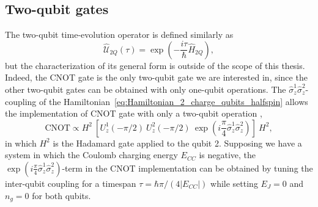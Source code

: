 \documentclass[../main/main.tex]{subfiles}
\begin{document}
\subsection{Two-qubit gates} \label{sect:2Q_gates_implementation}
The two-qubit time-evolution operator is defined similarly as
\begin{equation} \label{eq:time_evolution_H2Q}
    \hat{\mathcal{U}}_{2Q}(\tau) = \exp{\left(-\frac{i \tau}{\hbar} \hat{H}_{2Q}\right)},
\end{equation}
but the characterization of its general form is outside of the scope of this thesis. Indeed, the CNOT gate is the only two-qubit gate we are interested in, since the other two-qubit gates can be obtained with only one-qubit operations. The $\hat{\sigma}_z^1 \hat{\sigma}_z^2$-coupling of the Hamiltonian~\eqref{eq:Hamiltonian_2_charge_qubits_halfspin} allows the implementation of CNOT gate with only a two-qubit operation \cite[Appx.~B3]{RevModPhys.73.357}, 
\begin{equation} \label{eq:CNOT_gate}
   \text{CNOT} \propto H^2\ \left[U_z^1(-\pi/2)\ U_z^2(-\pi/2)\ \exp{\left(i\frac{\pi}{4} \hat{\sigma}_z^1 \hat{\sigma}_z^2 \right)}\right]\ H^2,
\end{equation}
in which $H^2$ is the Hadamard gate applied to the qubit 2. Supposing we have a system in which the Coulomb charging energy $E_{CC}$ is negative, the $\exp{\left(i\frac{\pi}{4} \hat{\sigma}_z^1 \hat{\sigma}_z^2 \right)}$-term in the CNOT implementation can be obtained by tuning the inter-qubit coupling for a timespan $\tau=\hbar \pi /(4 |E_{CC}|)$ while setting $E_J=0$ and $n_g=0$ for both qubits.
\end{document}
